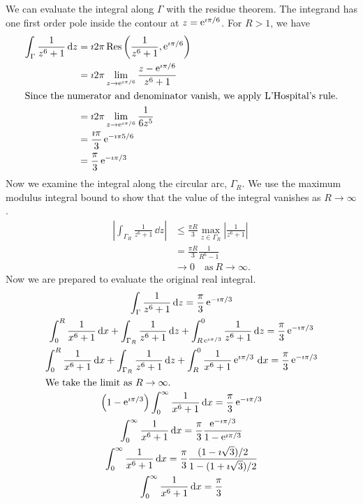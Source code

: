 {\begin{Solution}
  We can evaluate the integral along $\Gamma$ with the residue theorem.
  The integrand has one first order pole inside the contour at 
  $z = \mathop{\mathrm{e}}\nolimits^{\imath \pi / 6}$.   For  $R > 1$, we have
  \begin{align*}
    \int_\Gamma \frac{1}{z^6+1} \,\mathrm{d} z
    &= \imath 2 \pi \mathop{\mathrm{Res}}\nolimits\left( \frac{1}{z^6+1}, \mathop{\mathrm{e}}\nolimits^{\imath \pi / 6} \right) \\
    &= \imath 2 \pi \lim_{z \to \mathop{\mathrm{e}}\nolimits^{\imath \pi / 6} } 
    \frac{z - \mathop{\mathrm{e}}\nolimits^{\imath \pi / 6}}{z^6+1} \\
    \intertext{Since the numerator and denominator vanish, we apply 
      L'Hospital's rule.}
    &= \imath 2 \pi \lim_{z \to \mathop{\mathrm{e}}\nolimits^{\imath \pi / 6} } \frac{1}{6 z^5} \\
    &= \frac{\imath \pi}{3} \mathop{\mathrm{e}}\nolimits^{- \imath \pi 5 / 6} \\
    &= \frac{\pi}{3} \mathop{\mathrm{e}}\nolimits^{- \imath \pi / 3} 
  \end{align*}
  Now we examine the integral along the circular arc, $\Gamma_R$.
  We use the maximum modulus integral bound to show that the value of the 
  integral vanishes as $R \to \infty$.
  \begin{align*}
    \left| \int_{\Gamma_R} \frac{1}{z^6+1} \,\dd z \right|
    &\leq \frac{\pi R}{3} \max_{z \in \Gamma_R} 
    \left| \frac{1}{z^6+1} \right| \\
    &= \frac{\pi R}{3} \frac{1}{R^6-1} \\
    &\to 0 \quad \mathrm{as}\ R \to \infty.
  \end{align*}
  Now we are prepared to evaluate the original real integral.
  \begin{gather*}
    \int_\Gamma \frac{1}{z^6+1} \,\mathrm{d} z = \frac{\pi}{3} \mathop{\mathrm{e}}\nolimits^{- \imath \pi / 3} \\
    \int_0^R \frac{1}{x^6 + 1} \,\mathrm{d} x
    + \int_{\Gamma_R} \frac{1}{z^6 + 1}\,\mathrm{d}  z
    + \int_{R \mathop{\mathrm{e}}\nolimits^{\imath \pi / 3}}^0 \frac{1}{z^6 + 1}\,\mathrm{d}  z
    = \frac{\pi}{3} \mathop{\mathrm{e}}\nolimits^{- \imath \pi / 3} \\
    \int_0^R \frac{1}{x^6 + 1} \,\mathrm{d} x
    + \int_{\Gamma_R} \frac{1}{z^6 + 1}\,\mathrm{d}  z
    + \int_R^0 \frac{1}{x^6 + 1} \mathop{\mathrm{e}}\nolimits^{\imath \pi / 3} \,\mathrm{d} x
    = \frac{\pi}{3} \mathop{\mathrm{e}}\nolimits^{- \imath \pi / 3} \\
    \intertext{We take the limit as $R \to \infty$.}
    \left( 1 - \mathop{\mathrm{e}}\nolimits^{\imath \pi / 3} \right) \int_0^\infty \frac{1}{x^6 + 1} \,\mathrm{d} x
    = \frac{\pi}{3} \mathop{\mathrm{e}}\nolimits^{- \imath \pi / 3} \\
    \int_0^\infty \frac{1}{x^6 + 1} \,\mathrm{d} x 
    = \frac{\pi}{3} \frac{ \mathop{\mathrm{e}}\nolimits^{- \imath \pi / 3} }{ 1 - \mathop{\mathrm{e}}\nolimits^{\imath \pi / 3} } \\
    \int_0^\infty \frac{1}{x^6 + 1} \,\mathrm{d} x 
    = \frac{\pi}{3} \frac{ (1 - \imath \sqrt{3})/2 }{ 1 - (1 + \imath \sqrt{3})/2 }\\
    \int_0^\infty \frac{1}{x^6 + 1} \,\mathrm{d} x = \frac{\pi}{3} 
  \end{gather*}
\end{Solution}









}
